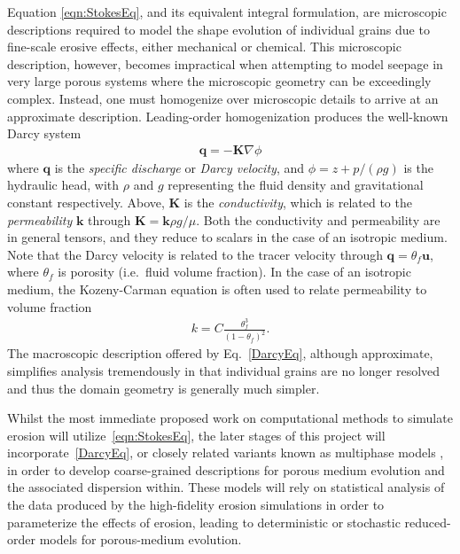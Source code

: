 \documentclass[11pt]{article}
\newcommand{\bvec}[1]{{\mathbf{#1}}}
\newcommand{\grad}{\nabla}
\newcommand{\uu}{\bvec{u}}
\newcommand {\qq} {\bvec{q}}
\begin{document}
Equation \eqref{eqn:StokesEq}, and its equivalent integral formulation, are microscopic descriptions required to model the shape evolution of individual grains due to fine-scale erosive effects, either mechanical or chemical. This microscopic description, however, becomes impractical when attempting to model seepage in very large porous systems where the microscopic geometry can be exceedingly complex. Instead, one must homogenize over microscopic details to arrive at an approximate description. Leading-order homogenization produces the well-known Darcy system 
\begin{align}
  \label{DarcyEq}
  \qq = - \bvec{K} \grad \phi
\end{align}
where $\qq$ is the {\em specific discharge} or {\em Darcy velocity}, and $\phi = z + p/(\rho g)$ is the hydraulic head, with $\rho$ and $g$ representing the fluid density and gravitational constant respectively.  Above, $\bvec{K}$ is the {\em conductivity}, which is related to the {\em permeability} $\bvec{k}$ through $\bvec{K} = \bvec{k} \rho g/\mu$.  Both the conductivity and permeability are in general tensors, and they reduce to scalars in the case of an isotropic medium. Note that the Darcy velocity is related to the tracer velocity through $\qq = \theta_f \uu$, where $\theta_f$ is porosity (i.e.~fluid volume fraction).  In the case of an isotropic medium, the Kozeny-Carman equation is often used to relate permeability to volume fraction~\cite{bear2013dynamics}
\begin{align}
  k = C \frac{\theta_f^3}{(1-\theta_f)^2}.
\end{align}
The macroscopic description offered by Eq.~\eqref{DarcyEq}, although approximate, simplifies analysis tremendously in that individual grains are no longer resolved and thus the domain geometry is generally much simpler.

Whilst the most immediate proposed work on computational methods to simulate erosion will utilize~\eqref{eqn:StokesEq}, the later stages of this project will incorporate~\eqref{DarcyEq}, or closely related variants known as multiphase models \cite{breward2003multiphase, cogan2010multiphase, Imma2019, eastham2019multiphase}, in order to develop coarse-grained descriptions for porous medium evolution and the associated dispersion within. These models will rely on statistical analysis of the data produced by the high-fidelity erosion simulations in order to parameterize the effects of erosion, leading to deterministic or stochastic reduced-order models for porous-medium evolution. 
\end{document}
